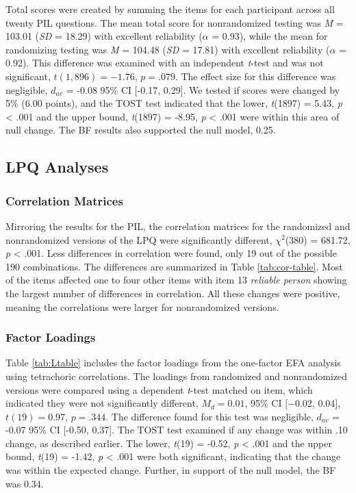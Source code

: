 \documentclass[english,man, mask]{apa6}
\theoremstyle{definition}
\theoremstyle{definition}
\theoremstyle{definition}
\theoremstyle{remark}
\begin{document}
Total scores were created by summing the items for each participant
across all twenty PIL questions. The mean total score for nonrandomized
testing was \emph{M} = 103.01 (\emph{SD} = 18.29) with excellent
reliability (\(\alpha\) = 0.93), while the mean for randomizing testing
was \emph{M} = 104.48 (\emph{SD} = 17.81) with excellent reliability
(\(\alpha\) = 0.92). This difference was examined with an independent
\emph{t}-test and was not significant, \(t(1,896) = -1.76\),
\(p = .079\). The effect size for this difference was negligible,
\(d_{av}\) = -0.08 95\% CI {[}-0.17, 0.29{]}. We tested if scores were
changed by 5\% (6.00 points), and the TOST test indicated that the
lower, \emph{t}(1897) = 5.43, \emph{p} \textless{} .001 and the upper
bound, \emph{t}(1897) = -8.95, \emph{p} \textless{} .001 were within
this area of null change. The BF results also supported the null model,
0.25.

\subsection{LPQ Analyses}\label{lpq-analyses}

\subsubsection{Correlation Matrices}\label{correlation-matrices-1}

Mirroring the results for the PIL, the correlation matrices for the
randomized and nonrandomized versions of the LPQ were significantly
different, \(\chi^2\)(380) = 681.72, \emph{p} \textless{} .001. Less
differences in correlation were found, only 19 out of the possible 190
combinations. The differences are summarized in Table
\ref{tab:cor-table}. Most of the items affected one to four other items
with item 13 \emph{reliable person} showing the largest number of
differences in correlation. All these changes were positive, meaning the
correlations were larger for nonrandomized versions.

\subsubsection{Factor Loadings}\label{factor-loadings-1}

Table \ref{tab:Ltable} includes the factor loadings from the one-factor
EFA analysis using tetrachoric correlations. The loadings from
randomized and nonrandomized versions were compared using a dependent
\emph{t}-test matched on item, which indicated they were not
significantly different, \(M_d = 0.01\), 95\% CI \([-0.02\), \(0.04]\),
\(t(19) = 0.97\), \(p = .344\). The difference found for this test was
negligible, \(d_{av}\) = -0.07 95\% CI {[}-0.50, 0.37{]}. The TOST test
examined if any change was within .10 change, as described earlier. The
lower, \emph{t}(19) = -0.52, \emph{p} \textless{} .001 and the upper
bound, \emph{t}(19) = -1.42, \emph{p} \textless{} .001 were both
significant, indicating that the change was within the expected change.
Further, in support of the null model, the BF was 0.34.
\end{document}

